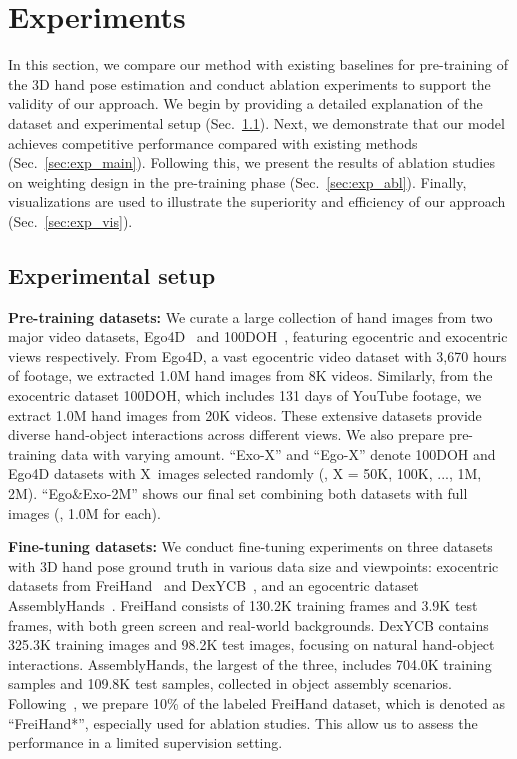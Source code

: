 \section{Experiments}
In this section, we compare our method with existing baselines for pre-training of the 3D hand pose estimation and conduct ablation experiments to support the validity of our approach. We begin by providing a detailed explanation of the dataset and experimental setup (Sec.~\ref{sec:exp_setup}). Next, we demonstrate that our model achieves competitive performance compared with existing methods (Sec.~\ref{sec:exp_main}). Following this, we present the results of ablation studies on weighting design in the pre-training phase (Sec.~\ref{sec:exp_abl}). Finally, visualizations are used to illustrate the superiority and efficiency of our approach (Sec.~\ref{sec:exp_vis}).

\subsection{Experimental setup}\label{sec:exp_setup}
\textbf{Pre-training datasets:}
We curate a large collection of hand images from two major video datasets, Ego4D~\citep{grauman:cvpr22} and 100DOH~\citep{shan:cvpr20}, featuring egocentric and exocentric views respectively. From Ego4D, a vast egocentric video dataset with 3,670 hours of footage, we extracted 1.0M hand images from 8K videos. Similarly, from the exocentric dataset 100DOH, which includes 131 days of YouTube footage, we extract 1.0M hand images from 20K videos. These extensive datasets provide diverse hand-object interactions across different views. We also prepare pre-training data with varying amount. ``Exo-X'' and ``Ego-X'' denote 100DOH and Ego4D datasets with X~images selected randomly (\eg, X = 50K, 100K, ..., 1M, 2M). ``Ego\&Exo-2M'' shows our final set combining both datasets with full images (\ie, 1.0M for each).

\textbf{Fine-tuning datasets:}
We conduct fine-tuning experiments on three datasets with 3D hand pose ground truth in various data size and viewpoints: exocentric datasets from FreiHand~\citep{zimmermann:iccv19} and DexYCB~\citep{chao:cvpr21}, and an egocentric dataset AssemblyHands~\citep{ohkawa:cvpr23}. FreiHand consists of 130.2K training frames and 3.9K test frames, with both green screen and real-world backgrounds. DexYCB contains 325.3K training images and 98.2K test images, focusing on natural hand-object interactions. AssemblyHands, the largest of the three, includes 704.0K training samples and 109.8K test samples, collected in object assembly scenarios. Following~\citep{spurr:iccv21}, we prepare 10\% of the labeled FreiHand dataset, which is denoted as ``FreiHand*'', especially used for ablation studies.
This allow us to assess the performance in a limited supervision setting.

